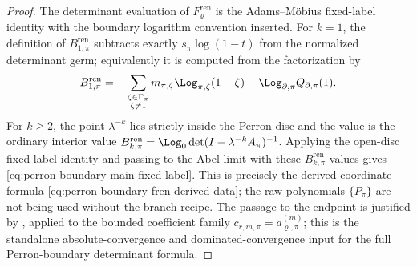 \begin{proof}
  The determinant evaluation of \(F_\varrho^{\mathrm{ren}}\) is the
  Adams--M\"obius fixed-label identity with the boundary logarithm convention
  inserted.  For \(k=1\), the definition of
  \(B_{1,\pi}^{\mathrm{ren}}\) subtracts exactly \(s_\pi\log(1-t)\) from the
  normalized determinant germ; equivalently it is computed from the
  factorization by
  \[
    B_{1,\pi}^{\mathrm{ren}}
    =
    -\sum_{\substack{\zeta\in\Gamma_\pi\\\zeta\ne1}}
      m_{\pi,\zeta}\Log_{\pi,\zeta}(1-\zeta)
    -\Log_{\partial,\pi}Q_{\partial,\pi}(1).
  \]
  For \(k\ge2\), the point \(\lambda^{-k}\) lies strictly inside the Perron
  disc and the value is the ordinary interior value
  \(B_{k,\pi}^{\mathrm{ren}}=\Log_0\det(I-\lambda^{-k}A_\pi)^{-1}\).  Applying
  the open-disc fixed-label identity and passing to the Abel limit with these
  \(B_{k,\pi}^{\mathrm{ren}}\) values gives
  \eqref{eq:perron-boundary-main-fixed-label}.  This is precisely the
  derived-coordinate formula
  \eqref{eq:perron-boundary-fren-derived-data}; the raw polynomials
  \(\{P_\pi\}\) are not being used without the branch recipe.  The passage to
  the endpoint is justified by
  , applied to the bounded
  coefficient family \(c_{r,m,\pi}=a_{\varrho,\pi}^{(m)}\); this is the
  standalone absolute-convergence and dominated-convergence input for the
  full Perron-boundary determinant formula.


\end{proof}
